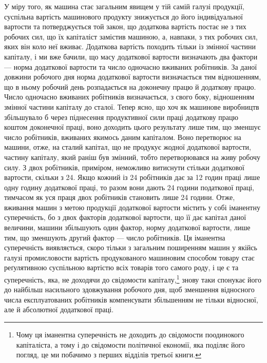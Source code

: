 У міру того, як машина стає загальним явищем у тій самій
галузі продукції, суспільна вартість машинового продукту знижується
до його індивідуальної вартости та потверджується той
закон, що додаткова вартість постає не з тих робочих сил, що їх
капіталіст замістив машиною, а, навпаки, з тих робочих сил,
яких він коло неї вживає. Додаткова вартість походить тільки
із змінної частини капіталу, і ми вже бачили, що масу додаткової
вартости визначають два фактори — норма додаткової вартости
та число одночасно вживаних робітників. За даної довжини робочого
дня норма додаткової вартости визначається тим відношенням,
що в ньому робочий день розпадається на доконечну працю
й додаткову працю. Число одночасно вживаних робітників визначається,
з свого боку, відношенням змінної частини капіталу до
сталої. Тепер ясно, що хоч як машинове виробництв збільшувало б
через піднесення продуктивної сили праці додаткову працю коштом
доконечної праці, воно доходить цього результату лише тим,
що зменшує число робітників, вживаних якимось даним капіталом.
Воно перетворює на машини, отже, на сталий капітал, що не продукує
жодної додаткової вартости, частину капіталу, який раніш
був змінний, тобто перетворювався на живу робочу силу. З двох
робітників, приміром, неможливо витиснути стільки додаткової
вартости, скільки з 24. Якщо кожний із 24 робітників дає за 12 годин
праці лише одну годину додаткової праці, то разом вони дають
24 години податкової праці, тимчасом як уся праця двох робітників
становить лише 24 години. Отже, вживання машин з метою
продукції додаткової вартости містить у собі іманентну суперечність,
бо з двох факторів додаткової вартости, що її дає капітал
даної величини, машини збільшують один фактор, норму додаткової
вартости, лише тим, що зменшують другий фактор —
число робітників. Ця іманентна суперечність виявляється, скоро
тільки з загальним поширенням машин у якійсь галузі промисловости
вартість продукованого машиновим способом товару стає
реґулятивною суспільною вартістю всіх товарів того самого
роду, і це є та суперечність, яка, не доходячи до свідомости капіталу,\footnote{
Чому ця іманентна суперечність не доходить до свідомости поодинокого
капіталіста, а тому і до свідомости політичної економії, яка поділяє
його погляд, це ми побачимо з перших відділів третьої книги.
}
знову таки спонукає його до найбільш насильного здовжування
робочого дня, щоб зменшення відносного числа експлуатованих
робітників компенсувати збільшенням не тільки
відносної, але й абсолютної додаткової праці.

